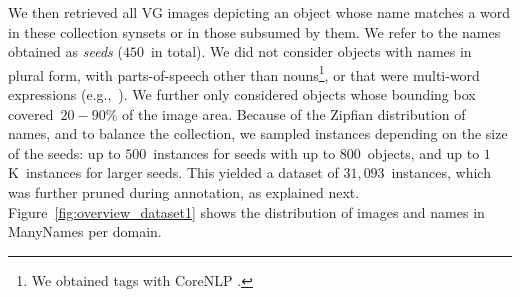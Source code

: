 We then retrieved all VG images depicting an object whose name matches a word in these collection synsets or in those subsumed by them. We refer to the names obtained as \textit{seeds} ($450$~in total).
We did not consider objects with names in plural form, with parts-of-speech other than nouns\footnote{We obtained tags with CoreNLP \cite{manning2014stanford}.}, or that were multi-word expressions (e.g.,~). 
We further only considered objects whose bounding box covered~\mbox{$20-90\%$} of the image area.
Because of the Zipfian distribution of names, and to balance the collection, we sampled instances depending on the size of the seeds: up to $500$~instances for seeds with up to $800$~objects, and up to $1$K~instances for larger seeds. This yielded a dataset of $31,093$~instances, which was further pruned during annotation, as explained next.
Figure~\ref{fig:overview_dataset1} shows the distribution of images and names in ManyNames per domain. 

